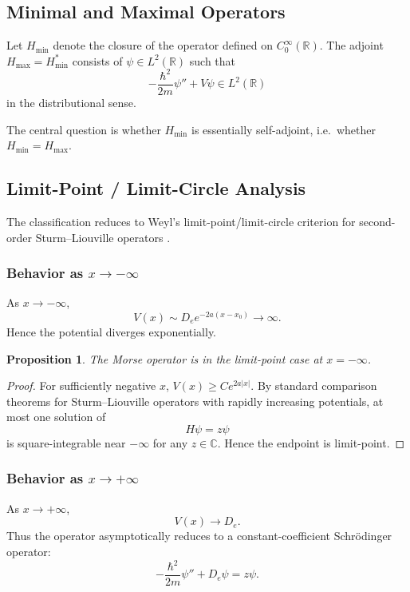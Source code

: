 \documentclass[11pt]{article}
\newtheorem{proposition}{Proposition}
\begin{document}
\subsection{Minimal and Maximal Operators}

Let $H_{\min}$ denote the closure of the operator defined on
$C_0^\infty(\mathbb{R})$.
The adjoint $H_{\max}=H_{\min}^*$ consists of
$\psi\in L^2(\mathbb{R})$ such that
\[
-\frac{\hbar^2}{2m}\psi''+V\psi\in L^2(\mathbb{R})
\]
in the distributional sense.

The central question is whether $H_{\min}$ is essentially
self-adjoint, i.e.\ whether $H_{\min}=H_{\max}$.

\subsection{Limit-Point / Limit-Circle Analysis}

The classification reduces to Weyl's limit-point/limit-circle
criterion for second-order Sturm--Liouville operators
\cite{reed-simon2}.

\subsubsection*{Behavior as $x\to -\infty$}

As $x\to -\infty$,
\[
V(x)\sim D_e e^{-2a(x-x_0)}\to\infty.
\]
Hence the potential diverges exponentially.

\begin{proposition}
The Morse operator is in the limit-point case at $x=-\infty$.
\end{proposition}

\begin{proof}
For sufficiently negative $x$, $V(x)\ge C e^{2a|x|}$.
By standard comparison theorems for Sturm--Liouville operators
with rapidly increasing potentials, at most one solution of
\[
H\psi = z\psi
\]
is square-integrable near $-\infty$ for any $z\in\mathbb C$.
Hence the endpoint is limit-point.
\end{proof}

\subsubsection*{Behavior as $x\to +\infty$}

As $x\to+\infty$,
\[
V(x)\to D_e.
\]
Thus the operator asymptotically reduces to a constant-coefficient
Schr\"odinger operator:
\[
-\frac{\hbar^2}{2m}\psi''+D_e\psi=z\psi.
\]
\end{document}
